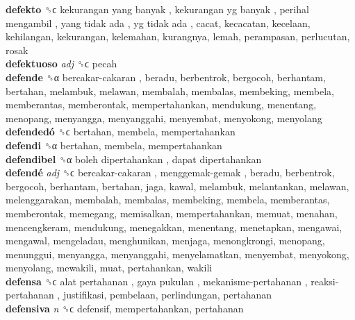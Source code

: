 \textbf{defekto} ␝ϲ   kekurangan yang banyak ,  kekurangan yg banyak ,  perihal mengambil ,  yang tidak ada ,  yg tidak ada , cacat, kecacatan, kecelaan, kehilangan, kekurangan, kelemahan, kurangnya, lemah, perampasan, perlucutan, rosak  \\
\textbf{defektuoso} \emph{adj}  ␝ϲ  pecah  \\
\textbf{defende} ␝α   bercakar-cakaran , beradu, berbentrok, bergocoh, berhantam, bertahan, melambuk, melawan, membalah, membalas, membeking, membela, memberantas, memberontak, mempertahankan, mendukung, menentang, menopang, menyangga, menyanggahi, menyembat, menyokong, menyolang  \\
\textbf{defendedó} ␝ϲ  bertahan, membela, mempertahankan  \\
\textbf{defendi} ␝α  bertahan, membela, mempertahankan  \\
\textbf{defendibel} ␝α   boleh dipertahankan ,  dapat dipertahankan   \\
\textbf{defendé} \emph{adj}  ␝ϲ   bercakar-cakaran ,  menggemak-gemak , beradu, berbentrok, bergocoh, berhantam, bertahan, jaga, kawal, melambuk, melantankan, melawan, melenggarakan, membalah, membalas, membeking, membela, memberantas, memberontak, memegang, memisalkan, mempertahankan, memuat, menahan, mencengkeram, mendukung, menegakkan, menentang, menetapkan, mengawai, mengawal, mengeladau, menghunikan, menjaga, menongkrongi, menopang, menunggui, menyangga, menyanggahi, menyelamatkan, menyembat, menyokong, menyolang, mewakili, muat, pertahankan, wakili  \\
\textbf{defensa} ␝ϲ   alat pertahanan ,  gaya pukulan ,  mekanisme-pertahanan ,  reaksi-pertahanan , justifikasi, pembelaan, perlindungan, pertahanan  \\
\textbf{defensiva} \emph{n}  ␝ϲ  defensif, mempertahankan, pertahanan  \\

